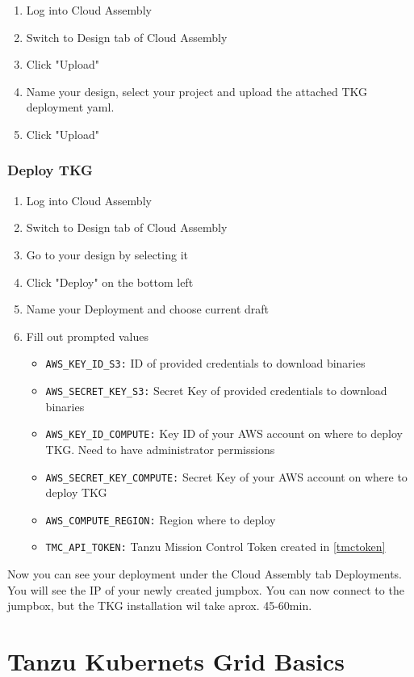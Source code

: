 \documentclass{article}
\begin{document}
\begin{enumerate}
  \item Log into Cloud Assembly
  \item Switch to Design tab of Cloud Assembly
  \item Click "Upload" 
  \item Name your design, select your project and upload the attached TKG deployment yaml.
  \item Click "Upload" 
\end{enumerate}


\subsubsection{Deploy TKG}

\begin{enumerate}
  \item Log into Cloud Assembly
  \item Switch to Design tab of Cloud Assembly
  \item Go to your design by selecting it
  \item Click "Deploy" on the bottom left
  \item Name your Deployment and choose current draft
  \item Fill out prompted values
  \begin{itemize}
  \item \verb|AWS_KEY_ID_S3:| ID of provided credentials to download binaries
  \item \verb|AWS_SECRET_KEY_S3:| Secret Key of provided credentials to download binaries
  \item \verb|AWS_KEY_ID_COMPUTE:| Key ID of your AWS account on where to deploy TKG. Need to have administrator permissions
  \item \verb|AWS_SECRET_KEY_COMPUTE:| Secret Key of your AWS account on where to deploy TKG
  \item \verb|AWS_COMPUTE_REGION:| Region where to deploy
  \item \verb|TMC_API_TOKEN:| Tanzu Mission Control Token created in \ref{tmctoken}
\end{itemize}
\end{enumerate}
Now you can see your deployment under the Cloud Assembly tab Deployments. You will see the IP of your newly created jumpbox. You can now connect to the jumpbox, but the TKG installation wil take aprox. 45-60min.



\section{Tanzu Kubernets Grid Basics}
\end{document}
